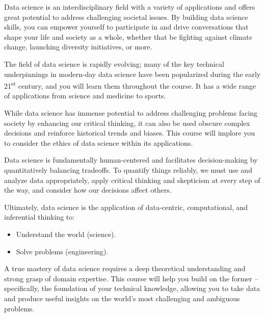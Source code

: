 \documentclass[
  letterpaper,
  DIV=11,
  numbers=noendperiod]{scrreprt}
\providecommand{\tightlist}{%
  \setlength{\itemsep}{0pt}\setlength{\parskip}{0pt}}\usepackage{longtable,booktabs,array}
\begin{document}
Data science is an interdisciplinary field with a variety of
applications and offers great potential to address challenging societal
issues. By building data science skills, you can empower yourself to
participate in and drive conversations that shape your life and society
as a whole, whether that be fighting against climate change, launching
diversity initiatives, or more.

The field of data science is rapidly evolving; many of the key technical
underpinnings in modern-day data science have been popularized during
the early 21\textsuperscript{st} century, and you will learn them
throughout the course. It has a wide range of applications from science
and medicine to sports.

While data science has immense potential to address challenging problems
facing society by enhancing our critical thinking, it can also be used
obscure complex decisions and reinforce historical trends and biases.
This course will implore you to consider the ethics of data science
within its applications.

Data science is fundamentally human-centered and facilitates
decision-making by quantitatively balancing tradeoffs. To quantify
things reliably, we must use and analyze data appropriately, apply
critical thinking and skepticism at every step of the way, and consider
how our decisions affect others.

Ultimately, data science is the application of data-centric,
computational, and inferential thinking to:

\begin{itemize}
\tightlist
\item
  Understand the world (science).
\item
  Solve problems (engineering).
\end{itemize}

A true mastery of data science requires a deep theoretical understanding
and strong grasp of domain expertise. This course will help you build on
the former -- specifically, the foundation of your technical knowledge,
allowing you to take data and produce useful insights on the world's
most challenging and ambiguous problems.
\end{document}
